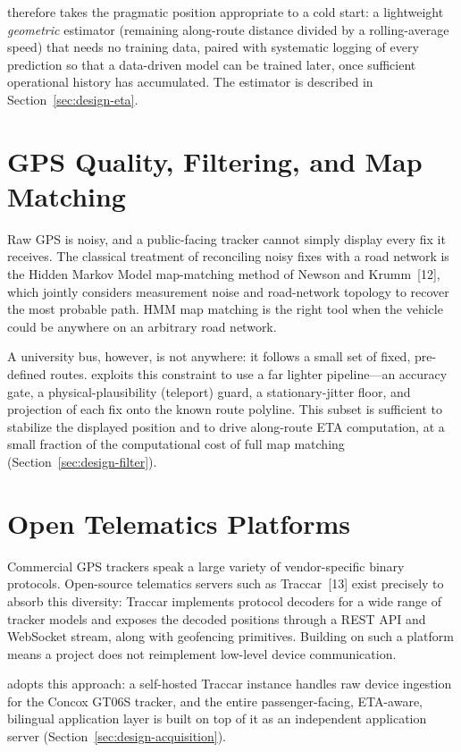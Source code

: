 \system{} therefore takes the pragmatic position appropriate to a cold
start: a lightweight \emph{geometric} estimator (remaining along-route
distance divided by a rolling-average speed) that needs no training data,
paired with systematic logging of every prediction so that a data-driven
model can be trained later, once sufficient operational history has
accumulated. The estimator is described in Section~\ref{sec:design-eta}.

\section{GPS Quality, Filtering, and Map Matching}
\label{sec:lit-gps}
Raw GPS is noisy, and a public-facing tracker cannot simply display every
fix it receives. The classical treatment of reconciling noisy fixes with a
road network is the Hidden Markov Model map-matching method of Newson and
Krumm~[12], which jointly considers measurement noise and road-network
topology to recover the most probable path. HMM map matching is the right
tool when the vehicle could be anywhere on an arbitrary road network.

A university bus, however, is not anywhere: it follows a small set of
fixed, pre-defined routes. \system{} exploits this constraint to use a far
lighter pipeline---an accuracy gate, a physical-plausibility (teleport)
guard, a stationary-jitter floor, and projection of each fix onto the
known route polyline. This subset is sufficient to stabilize the displayed
position and to drive along-route ETA computation, at a small fraction of
the computational cost of full map matching
(Section~\ref{sec:design-filter}).

\section{Open Telematics Platforms}
\label{sec:lit-telematics}
Commercial GPS trackers speak a large variety of vendor-specific binary
protocols. Open-source telematics servers such as Traccar~[13] exist
precisely to absorb this diversity: Traccar implements protocol decoders
for a wide range of tracker models and exposes the decoded positions
through a REST API and WebSocket stream, along with geofencing
primitives. Building on such a platform means a project does not
reimplement low-level device communication.

\system{} adopts this approach: a self-hosted Traccar instance handles raw
device ingestion for the Concox GT06S tracker, and the entire
passenger-facing, ETA-aware, bilingual application layer is built on top
of it as an independent application server
(Section~\ref{sec:design-acquisition}).

